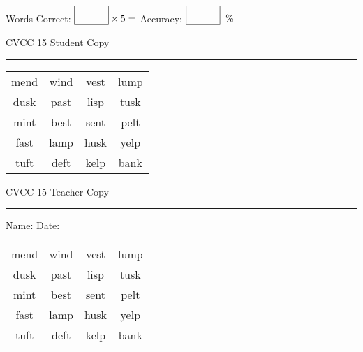 \documentclass{memoir}
\begin{document}
\small

Words Correct: $\fbox{\phantom{\huge 100}} \times 5 = $ Accuracy: $\fbox{\phantom{\huge 100}}\;\; \%$ 

\vfill

\newpage


\footnotesize \noindent
CVCC 15 \hfill Student Copy
\smallskip
\hrule

\Large

\setlength{\tabcolsep}{14pt}
\def\arraystretch{3}

{\selectfont


\begin{vplace}[0.5]
\begin{center}
\begin{tabular}{cccc}
mend & wind & vest & lump \\
dusk & past & lisp & tusk \\
mint & best  & sent & pelt \\
fast & lamp & husk & yelp \\
tuft & deft & kelp & bank \\
\end{tabular}
\end{center}
\end{vplace}

}

\newpage

\footnotesize \noindent
CVCC 15 \hfill Teacher Copy
\smallskip
\hrule

\small

\vfill

\noindent
Name: \underline{\hspace{1.75in}} \hfill Date: \underline{\hspace{1in}}

\Large

{\selectfont


\begin{vplace}[0.5]
\begin{center}
\begin{tabular}{cccc}
mend & wind & vest & lump \\
dusk & past & lisp & tusk \\
mint & best  & sent & pelt \\
fast & lamp & husk & yelp \\
tuft & deft & kelp & bank \\
\end{tabular}
\end{center}
\end{vplace}



}
\end{document}
